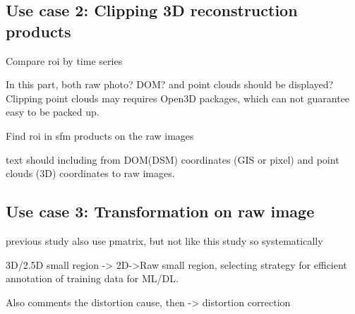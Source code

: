 \documentclass{configs/bmcart}
\begin{document}
\subsection*{Use case 2: Clipping 3D reconstruction products}


Compare \acrshort*{roi} by time series

In this part, both raw photo? DOM? and point clouds should be displayed? Clipping point clouds may requires Open3D packages, which can not guarantee easy to be packed up.

Find \acrshort*{roi} in \acrshort*{sfm} products on the raw images

text \cite{ma_calculation_2019, guo_illumination_2013}
should including from DOM(DSM) coordinates (GIS or pixel) and point clouds (3D) coordinates to raw images.

\subsection*{Use case 3: Transformation on raw image}
previous study also use pmatrix, but not like this study so systematically


3D/2.5D small region -> 2D->Raw small region, selecting strategy for efficient annotation of training data for ML/DL.

Also comments the distortion cause, then -> distortion correction 

%
%
%
%
%
%
%
%
%
%
%
\end{document}
